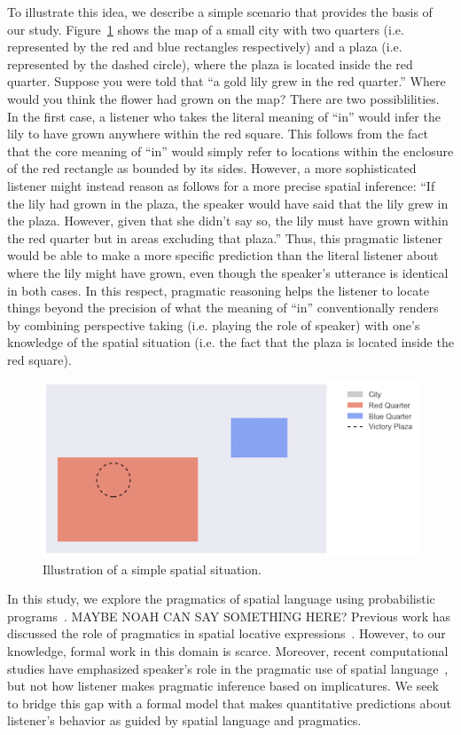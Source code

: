 \documentclass[10pt,letterpaper]{article}
\begin{document}
To illustrate this idea, we describe a simple scenario that provides the basis of our study. Figure~\ref{illustration} shows the map of a small city with two quarters (i.e. represented by the red and blue rectangles respectively) and a plaza (i.e. represented by the dashed circle), where the plaza is located inside the red quarter. Suppose you were told that ``a gold lily grew in the red quarter.'' Where would you think the flower had grown on the map? There are two possiblilities. In the first case, a listener who takes the literal meaning of ``in'' would infer the lily to have grown anywhere within the red square. This follows from the fact that the core meaning of ``in'' would simply refer to locations within the enclosure of the red rectangle as bounded by its sides. However, a more sophisticated listener might instead reason as follows for a more precise spatial inference: ``If the lily had grown in the plaza, the speaker would have said that the lily grew in the plaza. However, given that she didn't say so, the lily must have grown within the red quarter but in areas excluding that plaza.'' Thus, this pragmatic listener would be able to make a more specific prediction than the literal listener about where the lily might have grown, even though the speaker's utterance is identical in both cases. In this respect, pragmatic reasoning helps the listener to locate things beyond the precision of what the meaning of ``in'' conventionally renders by combining perspective taking (i.e. playing the role of speaker) with one's knowledge of the spatial situation (i.e. the fact that the plaza is located inside the red square).

\begin{figure}[H]
\includegraphics[scale=.5]{figures/cityA1.png}
\caption{Illustration of a simple spatial situation.}
\label{illustration}
\end{figure}

In this study, we explore the pragmatics of spatial language using probabilistic programs~\cite{}. MAYBE NOAH CAN SAY SOMETHING HERE? Previous work has discussed the role of pragmatics in spatial locative expressions~\cite{herskovits85,herskovits87}. However, to our knowledge, formal work in this domain is scarce. Moreover, recent computational studies have emphasized speaker's role in the pragmatic use of spatial language~\cite{carstensen14,golland10}, but not how listener makes pragmatic inference based on implicatures. We seek to bridge this gap with a formal model that makes quantitative predictions about listener's behavior as guided by spatial language and pragmatics. 
\end{document}
